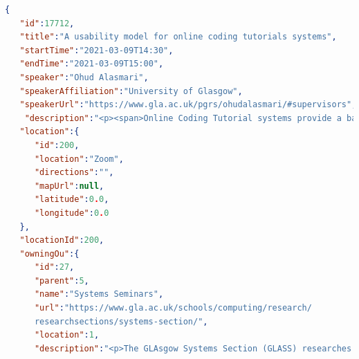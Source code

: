 \documentclass{l4proj}
\begin{document}
\begin{appendices}
\begin{lstlisting}[language=json, caption={Extract of JSON response from Samoa Events API.}]
{
   "id":17712,
   "title":"A usability model for online coding tutorials systems",
   "startTime":"2021-03-09T14:30",
   "endTime":"2021-03-09T15:00",
   "speaker":"Ohud Alasmari",
   "speakerAffiliation":"University of Glasgow",
   "speakerUrl":"https://www.gla.ac.uk/pgrs/ohudalasmari/#supervisors",
    "description":"<p><span>Online Coding Tutorial systems provide a basis for free and open interactive programming education at scale. Such browser-based systems featuring automated feedback are increasingly popular as remote learning has become normalized. Programming students with different social and cultural backgrounds from all over the world can access these platforms. In addition, Online Coding Tutorials facilitate practical software development experiences that form an integral part of the learning process for novice programmers. However, such systems will only be truly effective if they meet diverse programming learner requirements. In this paper, we argue that these requirements must be informed by a range of disciplines, including system usability, computing pedagogy, and internationalization. We conducted a wide-ranging survey of partially relevant usability models; from these studies we synthesized a new and specialized hierarchical usability model for Online Coding Tutorial systems. This new model has four dimensions: pedagogy, platform, culture and cognition. We claim that, in relation to previous models, our multi-dimensional framework covers a more comprehensive range of requirements for online programming language learners. This framework can be used to characterize and compare existing online tools, as well as to inform good design practice for new tools. We provide initial evidence of the potential utility of our model by applying it to three mainstream programming learning tools: LearnPython, TryRuby, and TryJavaScript.</span></p>",
   "location":{
      "id":200,
      "location":"Zoom",
      "directions":"",
      "mapUrl":null,
      "latitude":0.0,
      "longitude":0.0
   },
   "locationId":200,
   "owningOu":{
      "id":27,
      "parent":5,
      "name":"Systems Seminars",
      "url":"https://www.gla.ac.uk/schools/computing/research/
      researchsections/systems-section/",
      "location":1,
      "description":"<p>The GLAsgow Systems Section (GLASS) researches parallel and distributed systems, networked systems and (safety-critical) software systems. We have a strong focus on real-world systems, and cover all scales and across the hardware-software spectrum. We contribute to, develop and release open source research software. There are several research groups within the section:</p>\r\n<ul>\r\n<li><span><a href=\"http://www.dcs.gla.ac.uk/research/gpg/\">GPG: The Glasgow Parallelism Group</a></span><span>&nbsp;(led by Phil Trinder)</span></li>\r\n<li><span><a href=\"http://www.dcs.gla.ac.uk/research/networked-systems/\">

\end{lstlisting}
\end{appendices}
\end{document}
